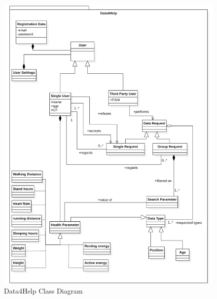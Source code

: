 \documentclass[titlepage]{article}
\begin{document}
		\begin{figure}[ht]
			\center
  			\includegraphics[width=\textwidth]{Diagrammi/D4HClass.png}
  			\caption{Data4Help Class Diagram}
 			\label{fig:D4HClass}
		\end{figure}
\end{document}

